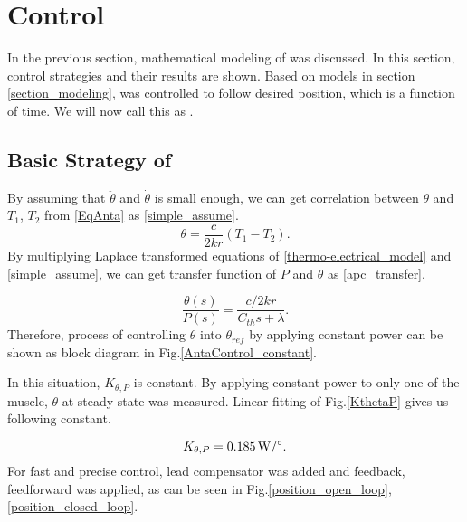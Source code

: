 \section{Control}
In the previous section, mathematical modeling of \scp was discussed. In this section, control strategies and their results are shown. Based on models in section \ref{section_modeling}, \anta was controlled to follow desired position, which is a function of time. We will now call this as \apcnospace.

\subsection{Basic Strategy of \APC}
By assuming that $\ddot{\theta}$ and $\dot{\theta}$ is small enough, we can get correlation between $\theta$ and $T_{1}$, $T_{2}$ from \eqref{EqAnta} as \eqref{simple_assume}.
\begin{equation} \label{simple_assume}
\theta = \frac{c}{2kr}(T_{1}-T_{2}).
\end{equation}
By multiplying Laplace transformed equations of \eqref{thermo-electrical_model} and \eqref{simple_assume}, we can get transfer function of $P$ and $\theta$ as \eqref{apc_transfer}.

\begin{equation} \label{apc_transfer}
\frac{\theta(s)}{P(s)} = \frac{c/2kr}{C_{th}s+\lambda}.
\end{equation}
Therefore, process of controlling $\theta$ into $\theta_{ref}$ by applying constant power can be shown as block diagram in Fig.\ref{AntaControl_constant}. 

In this situation, $K_{\theta,P}$ is constant. By applying constant power to only one of the muscle, $\theta$ at steady state was measured. Linear fitting of Fig.\ref{KthetaP} gives us following constant.

\begin{equation}
K_{\theta,P} = \SI{0.185}{\watt\per\degree}. \notag
\end{equation}
For fast and precise control, lead compensator was added and feedback, feedforward was applied, as can be seen in Fig.\ref{position_open_loop}, \ref{position_closed_loop}.

